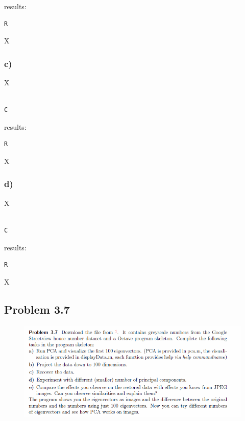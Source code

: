 results:

\begin{lstlisting}[caption=Result of 1.1 a), keywordstyle=\color{black}]
R
\end{lstlisting}

X





\subsubsection{c)}

X

\begin{lstlisting}[caption=todo]

C

\end{lstlisting}


results:

\begin{lstlisting}[caption=Result of 1.1 a), keywordstyle=\color{black}]
R
\end{lstlisting}

X



\subsubsection{d)}

X

\begin{lstlisting}[caption=todo]

C

\end{lstlisting}


results:

\begin{lstlisting}[caption=Result of 1.1 a), keywordstyle=\color{black}]
R
\end{lstlisting}

X








\subsection{Problem 3.7}


\begin{figure}[!ht]
\includegraphics[width=1\textwidth]{chapters/images/desc-3-7}
\end{figure}


